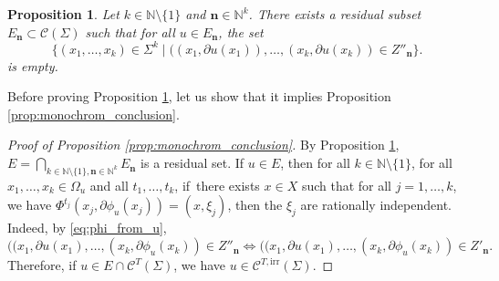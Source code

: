 \documentclass[10pt]{amsart}
\let\mathcal\mathscr
\let\sep\mid
\newcommand{\irr}{\mathrm{irr}}
\theoremstyle{plain}
\newtheorem{proposition}[theorem]{Proposition}
\theoremstyle{definition}
\newcommand{\N}{\mathbb{N}}
\def\calC{\mathcal{C}}
\begin{document}
\begin{proposition}\label{prop:irrational_monochromatic}
Let $k\in \N \setminus \{1\}$ and $\boldsymbol{n}\in \N^k$. There exists a residual subset $E_{\boldsymbol{n}}\subset \calC(\Sigma)$ such that for all $u\in E_{\boldsymbol{n}}$, the set
\[
\bigl\{(x_1,\dots, x_k)\in \Sigma^k \sep ((x_1, \partial u(x_1)),\dots,(x_k, \partial u(x_k)) \in Z''_{\boldsymbol{n}} \bigr\}.
\]
is empty.
\end{proposition}

Before proving Proposition \ref{prop:irrational_monochromatic}, let us show that it implies Proposition \ref{prop:monochrom_conclusion}.
\begin{proof}[Proof of Proposition \ref{prop:monochrom_conclusion}]
By Proposition \ref{prop:irrational_monochromatic}, $E= \bigcap_{k\in \N\setminus\{1\}, \boldsymbol{n}\in \N^k} E_{\boldsymbol{n}}$ is a residual set. If $u\in E$, then for all $k\in \N\setminus\{1\}$, for all $x_1,\dots, x_k\in \Omega_u$ and all $t_1,\dots, t_k$, if~there exists $x\in X$ such that for all $j=1,\dots,k$, we have $\Phi^{t_j}(x_j, \partial \phi_u(x_j)) = (x,\xi_j)$, then the $\xi_j$ are rationally independent. Indeed, by \eqref{eq:phi_from_u},
\[
((x_1,\partial u(x_1),\dots,(x_k,\partial \phi_u(x_k))\in Z''_{\boldsymbol{n}}\iff ((x_1,\partial u(x_1),\dots,(x_k,\partial \phi_u(x_k))\in Z'_{\boldsymbol{n}}.
\]
Therefore, if $u\in E \cap \calC^T(\Sigma)$, we have $u\in \mathcal{C}^{T,\irr}(\Sigma)$.
\end{proof}
\end{document}

